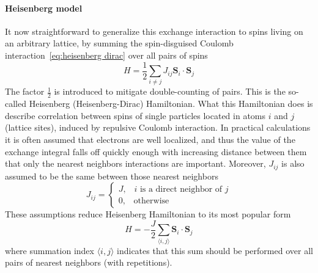 \paragraph{Heisenberg model}It now straightforward to generalize this exchange interaction to spins living on an arbitrary
lattice, by summing the spin-disguised Coulomb interaction~\eqref{eq:heisenberg dirac} over all pairs
of spins
\begin{equation}
    H = \frac{1}{2}\sum_{i\neq j} J_{ij} \bm{S}_i \cdot \bm{S}_j
    \label{eq:Heisenberg model}
\end{equation}
The factor \(\frac{1}{2}\) is introduced to mitigate double-counting of pairs.
This is the so-called Heisenberg (Heisenberg-Dirac) Hamiltonian. What this Hamiltonian
does is describe correlation between spins of single particles located in atoms \(i\) and \(j\)
(lattice sites), induced by repulsive Coulomb interaction. 
In practical calculations it is often assumed that electrons are well localized, and thus
the value of the exchange integral falls off quickly enough with increasing distance between them
that only the nearest neighbors interactions are important. Moreover, \(J_{ij}\) is also assumed
to be the same between those nearest neighbors
\begin{equation}
    J_{ij} = \begin{cases}
        J,\;\;\; i \textrm{ is a direct neighbor of } j\\
        0,\;\;\; \textrm{otherwise}
    \end{cases}
\end{equation}
These assumptions reduce Heisenberg Hamiltonian to its most popular form
\begin{equation}
    H = -\frac{J}{2}\sum_{\langle i,j \rangle} \bm{S}_i \cdot \bm{S}_j
    \label{eq:canonical Heisenberg}
\end{equation}
where summation index \(\langle i,j \rangle\) indicates that this sum should be performed over all pairs
of nearest neighbors (with repetitions).

